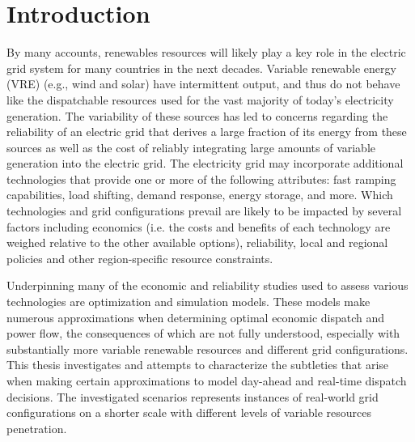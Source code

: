 \documentclass[12pt,LUDisStyle,twosided]{book}
\begin{document}
\pagestyle{plain}
\dissertationtrue



\tableofcontents
\nopagebreak
{}
\listoftables
{}
\listoffigures
\newpage
\pagestyle{plain}

\pagestyle{plain}

\chapter{Introduction}

By many accounts, renewables resources will likely play a key role in the electric grid system for many countries in the next decades.  Variable renewable energy (VRE) (e.g., wind and solar) have intermittent output, and thus do not behave like the dispatchable resources used for the vast majority of today’s electricity generation. The variability of these sources has led to concerns regarding the reliability of an electric grid that derives a large fraction of its energy from these sources as well as the cost of reliably integrating large amounts of variable generation into the electric grid. The electricity grid may incorporate additional technologies that provide one or more of the following attributes: fast ramping capabilities, load shifting, demand response, energy storage, and more.   Which technologies and grid configurations prevail are likely to be impacted by several factors including economics (i.e. the costs and benefits of each technology are weighed relative to the other available options), reliability, local and regional policies and other region-specific resource constraints.

Underpinning many of the economic and reliability studies used to assess various technologies are optimization and simulation models.  These models make numerous approximations when determining optimal economic dispatch and power flow, the consequences of which are not fully understood, especially with substantially more variable renewable resources and different grid configurations.  This thesis investigates and attempts to characterize the subtleties that arise when making certain approximations to model day-ahead and real-time dispatch decisions. The investigated scenarios represents instances of real-world grid configurations on a shorter scale with different levels of variable resources penetration.
\end{document}
